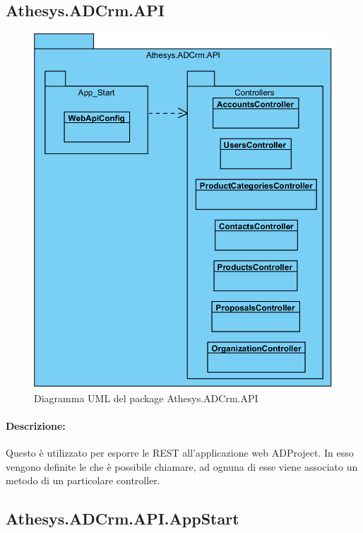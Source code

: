 \subsection{Athesys.ADCrm.API}
\begin{figure}[H]
	\centering
	\includegraphics[width=\linewidth]{images/modules/API}
	\caption{Diagramma UML del package Athesys.ADCrm.API}
	\label{fig:api}
\end{figure}
\paragraph{Descrizione:} 
Questo  è utilizzato per esporre le  REST all'applicazione web ADProject. In esso vengono definite le  che è possibile chiamare, ad ognuna di esse viene associato un metodo di un particolare controller. 





\subsection{Athesys.ADCrm.API.AppStart}
